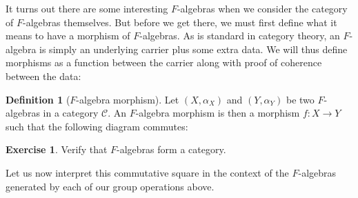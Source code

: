 \documentclass{article}
\theoremstyle{plain}
\theoremstyle{definition}
\newtheorem{definition}{Definition}
\newtheorem{exercise}{Exercise}
\begin{document}
It turns out there are some interesting \ensuremath{F}-algebras when we consider the category of \ensuremath{F}-algebras themselves. But before we get there, we must first define what it means to have a morphism of \ensuremath{F}-algebras. As is standard in category theory, an \ensuremath{F}-algebra is simply an underlying carrier plus some extra data. We will thus define morphisms as a function between the carrier along with proof of coherence between the data:

\begin{definition}[\ensuremath{F}-algebra morphism]
 Let \ensuremath{\left( X, {\alpha }_{X} \right)} and \ensuremath{\left( Y, {\alpha }_{Y} \right)} be two \ensuremath{F}-algebras in a category \ensuremath{\mathcal{C}}. An \ensuremath{F}-algebra morphism is then a morphism \ensuremath{f : X \rightarrow Y} such that the following diagram commutes:


\begin{center}
\end{center}
 
\end{definition}
\label{fAlgMor} 

\begin{exercise}
Verify that \ensuremath{F}-algebras form a category.
\end{exercise}


Let us now interpret this commutative square in the context of the \ensuremath{F}-algebras generated by each of our group operations above.
\end{document}
